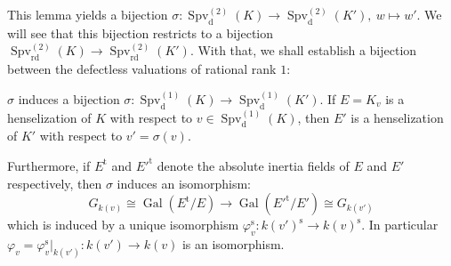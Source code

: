This lemma yields a bijection $\sigma:\operatorname{Spv}_\text{d}^{(2)}(K) \to\operatorname{Spv}_\text{d}^{(2)}(K'),\ w\mapsto w'$. We will see that this bijection restricts to a bijection $\operatorname{Spv}_\text{rd}^{(2)}(K)\to \operatorname{Spv}_\text{rd}^{(2)}(K')$. With that, we shall establish a bijection between the defectless valuations of rational rank $1$:

\begin{proposition}\label{3.2}
$\sigma$ induces a bijection $\sigma:\operatorname{Spv}_\text{d}^{(1)}(K) \to\operatorname{Spv}_\text{d}^{(1)}(K')$. If $E=K_v$ is a henselization of $K$ with respect to $v\in\operatorname{Spv}_\text{d}^{(1)}(K)$, then $E'$ is a henselization of $K'$ with respect to $v'=\sigma(v)$. 

Furthermore, if $E^{\text{t}}$ and $E'^{\text{t}}$ denote the absolute inertia fields of $E$ and $E'$ respectively, then $\sigma$ induces an isomorphism:
\[ G_{k(v)}\cong\operatorname{Gal}(E^\text{t}/E) \to\operatorname{Gal}(E'^{\text{t}}/E')\cong G_{k(v')} \]
which is induced by a unique isomorphism $\varphi_v^\text{s}:k(v')^\text{s}\to k(v)^\text{s}$. In particular $\varphi_v=\varphi_v^\text{s}|_{k(v')}:k(v')\to k(v)$ is an isomorphism.
\end{proposition}

